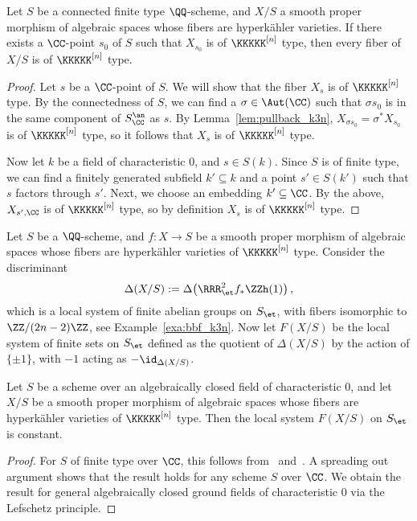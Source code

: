 \begin{lemma}\label{lem:one_fiber_every_fiber}
Let $S$ be a connected finite type $\QQ$-scheme, and $X/S$ a smooth proper morphism of algebraic spaces whose fibers are hyperk\"ahler varieties. If there exists a $\CC$-point $s_0$ of $S$ such that $X_{s_0}$ is of $\KKKKK^{[n]}$ type, then every fiber of $X/S$ is of $\KKKKK^{[n]}$ type.
\end{lemma}
\begin{proof}
Let $s$ be a $\CC$-point of $S$. We will show that the fiber $X_s$ is of $\KKKKK^{[n]}$ type. By the connectedness of $S$, we can find a $\sigma \in \Aut(\CC)$ such that $\sigma s_0$ is in the same component of $S_{\CC}^{\an}$ as $s$. By Lemma~\ref{lem:pullback_k3n}, $X_{\sigma s_0} = \sigma^* X_{s_0}$ is of $\KKKKK^{[n]}$ type, so it follows that $X_s$ is of $\KKKKK^{[n]}$ type.

Now let $k$ be a field of characteristic $0$, and $s \in S(k)$. Since $S$ is of finite type, we can find a finitely generated subfield $k' \subseteq k$ and a point $s' \in S(k')$ such that $s$ factors through $s'$. Next, we choose an embedding $k' \subseteq \CC$. By the above, $X_{s',\CC}$ is of $\KKKKK^{[n]}$ type, so by definition $X_s$ is of $\KKKKK^{[n]}$ type.
\end{proof}

Let $S$ be a $\QQ$-scheme, and $f\colon X \rightarrow S$ be a smooth proper morphism of algebraic spaces whose fibers are hyperk\"ahler varieties of $\KKKKK^{[n]}$ type. Consider the discriminant
$$
\Delta(X/S) := \Delta\!\left( \RRR^2_{\et}f_* \ZZh(1) \right),
$$
which is a local system of finite abelian groups on $S_{\et}$, with fibers isomorphic to $\ZZ/(2n-2)\ZZ$, see Example~\ref{exa:bbf_k3n}. Now let $F(X/S)$ be the local system of finite sets on $S_{\et}$ defined as the quotient of $\Delta(X/S)$ by the action of $\{\pm 1\}$, with $-1$ acting as $-\id_{\Delta(X/S)}$.

\begin{theorem}[Markman]\label{thm:markman}
    Let $S$ be a scheme over an algebraically closed field of characteristic $0$, and let $X/S$ be a smooth proper morphism of algebraic spaces whose fibers are hyperk\"ahler varieties of $\KKKKK^{[n]}$ type. Then the local system $F(X/S)$ on $S_{\et}$ is constant.
\end{theorem}
\begin{proof}
For $S$ of finite type over $\CC$, this follows from~\cite[Lemma~9.2]{MarkmanSurvey} and~\cite[Corollaire~XII.5.2]{SGA1}. A spreading out argument shows that the result holds for any scheme $S$ over $\CC$. We obtain the result for general algebraically closed ground fields of characteristic $0$ via the Lefschetz principle.
\end{proof}

